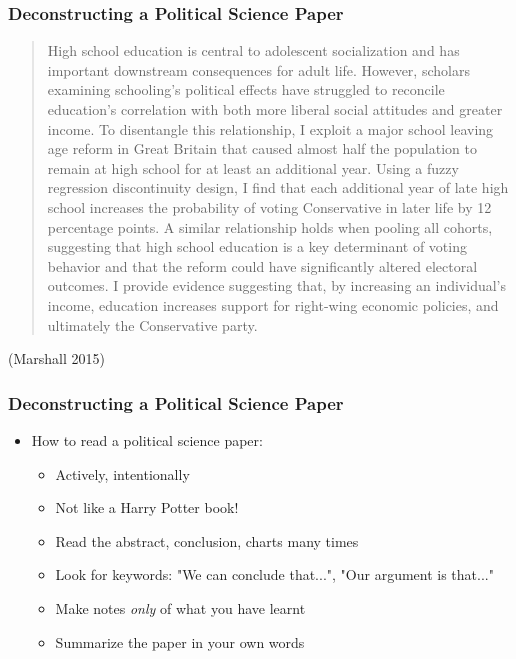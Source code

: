 \documentclass[xcolor=x11names,compress]{beamer}\usepackage[]{graphicx}\usepackage[]{color}
\renewcommand{\(}{\begin{columns}}
\renewcommand{\)}{\end{columns}}
\newcommand{\<}[1]{\begin{column}{#1}}
\renewcommand{\>}{\end{column}}
\begin{document}
\begin{frame}
\frametitle{Deconstructing a Political Science Paper}
\scriptsize
\begin{quotation}
High school education is central to adolescent socialization and has important downstream consequences for adult life. However, scholars examining schooling’s political effects have struggled to reconcile education’s correlation with both more liberal social attitudes and greater income. To disentangle this relationship, I exploit a major school leaving age reform in Great Britain that caused almost half the population to
remain at high school for at least an additional year. Using a fuzzy regression discontinuity design, I find that each additional year of late high school increases the probability of voting Conservative in later life by 12 percentage points. A similar relationship holds when pooling all cohorts, suggesting that high school education is a key determinant of voting behavior and that the reform could have significantly altered
electoral outcomes. I provide evidence suggesting that, by increasing an individual’s income, education increases support for right-wing economic policies, and ultimately the Conservative party.
\end{quotation}
(Marshall 2015)
\normalsize
\end{frame}

\begin{frame}
\frametitle{Deconstructing a Political Science Paper}
\begin{itemize}
\item How to read a political science paper:
\pause
\begin{itemize}
\item Actively, intentionally
\pause
\item Not like a Harry Potter book!
\pause
\item Read the abstract, conclusion, charts many times
\pause
\item Look for keywords: "We can conclude that...", "Our argument is that..."
\pause
\item Make notes \textit{only} of what you have learnt
\pause
\item Summarize the paper in your own words
\end{itemize}
\end{itemize}
\end{frame}
\end{document}
